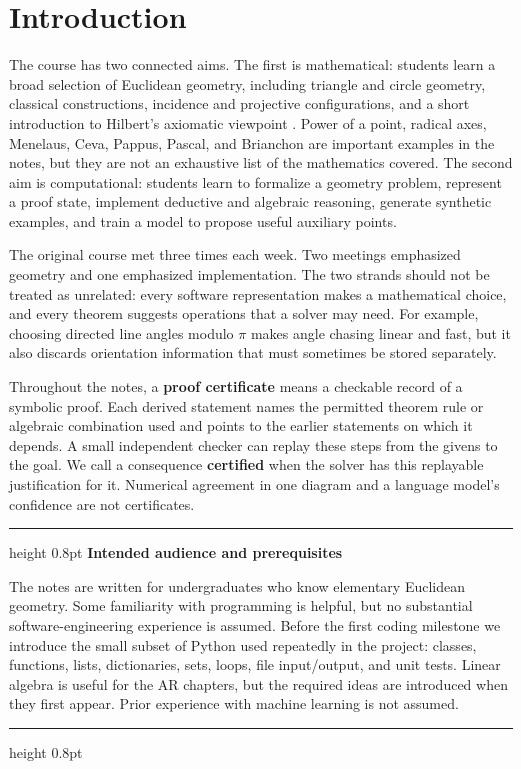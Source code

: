 \documentclass[reqno]{amsart}
\newenvironment{lecturebox}[1]{%
    \par\medskip
    \noindent\begingroup
    \setlength{\parindent}{0pt}
    \color{agblue}\hrule height 0.8pt\color{black}
    \smallskip
    \textbf{\color{agblue}#1}\par\smallskip
}{%
    \smallskip
    \color{agblue}\hrule height 0.8pt\color{black}
    \endgroup
    \medskip
}
\newcommand{\keyterm}[1]{\textbf{\color{agblue}#1}}
\DeclareMathOperator{\1}{\textbf{1}}
\begin{document}
\section{Introduction}\label{sec: Intro}
The course has two connected aims.  The first is mathematical: students learn
a broad selection of Euclidean geometry, including triangle and circle
geometry, classical constructions, incidence and projective configurations,
and a short introduction to Hilbert's axiomatic viewpoint
\cite{hartshorne2013geometry}. Power of a point, radical axes, Menelaus,
Ceva, Pappus, Pascal, and Brianchon are important examples in the notes, but
they are not an exhaustive list of the mathematics covered. The second aim is
computational: students learn to formalize a geometry problem, represent a
proof state, implement deductive and algebraic reasoning, generate synthetic
examples, and train a model to propose useful auxiliary points.

The original course met three times each week.  Two meetings emphasized
geometry and one emphasized implementation.  The two strands should not be
treated as unrelated: every software representation makes a mathematical
choice, and every theorem suggests operations that a solver may need.  For
example, choosing directed line angles modulo $\pi$ makes angle chasing linear
and fast, but it also discards orientation information that must sometimes be
stored separately.

Throughout the notes, a \keyterm{proof certificate} means a checkable record
of a symbolic proof. Each derived statement names the permitted theorem rule
or algebraic combination used and points to the earlier statements on which it
depends. A small independent checker can replay these steps from the givens to
the goal. We call a consequence \keyterm{certified} when the solver has this
replayable justification for it. Numerical agreement in one diagram and a
language model's confidence are not certificates.

\begin{lecturebox}{Intended audience and prerequisites}
The notes are written for undergraduates who know elementary Euclidean
geometry. Some familiarity with programming is helpful, but no substantial
software-engineering experience is assumed. Before the first coding milestone
we introduce the small subset of Python used repeatedly in the project:
classes, functions, lists, dictionaries, sets, loops, file input/output, and
unit tests. Linear algebra is useful for the AR chapters, but the required
ideas are introduced when they first appear. Prior experience with machine
learning is not assumed.
\end{lecturebox}
\end{document}
